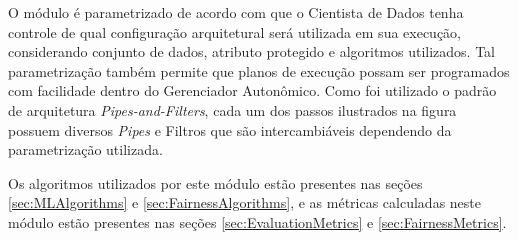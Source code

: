 \documentclass[portugues]{ic-tese}
\begin{document}
O módulo é parametrizado de acordo com que o Cientista de Dados tenha controle de qual configuração arquitetural será utilizada em sua execução, considerando conjunto de dados, atributo protegido e algoritmos utilizados. Tal parametrização também permite que planos de execução possam ser programados com facilidade dentro do Gerenciador Autonômico. Como foi utilizado o padrão de arquitetura \textit{Pipes-and-Filters}, cada um dos passos ilustrados na figura possuem diversos \textit{Pipes} e Filtros que são intercambiáveis dependendo da parametrização utilizada.

Os algoritmos utilizados por este módulo estão presentes nas seções \ref{sec:MLAlgorithms} e \ref{sec:FairnessAlgorithms}, e as métricas calculadas neste módulo estão presentes nas seções \ref{sec:EvaluationMetrics} e \ref{sec:FairnessMetrics}.
\end{document}
